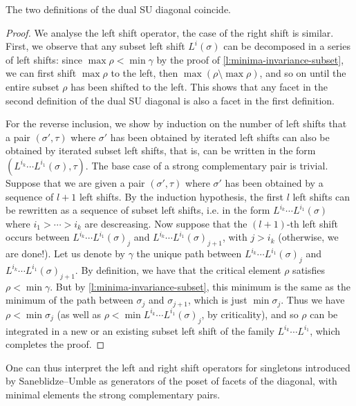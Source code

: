 \begin{proposition}
    The two definitions of the dual SU diagonal coincide. 
\end{proposition}

\begin{proof}
    We analyse the left shift operator, the case of the right shift is similar. 
    First, we observe that any subset left shift $L^{i}(\sigma)$ can be decomposed in a series of left shifts: since $\max \rho < \min \gamma$ by the proof of \cref{l:minima-invariance-subset}, we can first shift $\max \rho$ to the left, then $\max (\rho \setminus \max \rho)$, and so on until the entire subset $\rho$ has been shifted to the left. 
    This shows that any facet in the second definition of the dual SU diagonal is also a facet in the first definition. 

    For the reverse inclusion, we show by induction on the number of left shifts that a pair $(\sigma',\tau)$ where $\sigma'$ has been obtained by iterated left shifts can also be obtained by iterated subset left shifts, that is, can be written in the form $(L^{i_k}\cdots L^{i_1}(\sigma), \tau)$.
    The base case of a strong complementary pair is trivial. 
    Suppose that we are given a pair $(\sigma',\tau)$ where $\sigma'$ has been obtained by a sequence of $l+1$ left shifts. 
    By the induction hypothesis, the first $l$ left shifts can be rewritten as a sequence of subset left shifts, i.e. in the form $L^{i_k}\cdots L^{i_1}(\sigma)$ where $i_1 > \cdots > i_k$ are descreasing.
    Now suppose that the $(l+1)$-th left shift occurs between $L^{i_k}\cdots L^{i_1}(\sigma)_j$ and $L^{i_k}\cdots L^{i_1}(\sigma)_{j+1}$, with $j> i_k$ (otherwise, we are done!). 
    Let us denote by $\gamma$ the unique path between $L^{i_k}\cdots L^{i_1}(\sigma)_j$ and $L^{i_k}\cdots L^{i_1}(\sigma)_{j+1}$.
    By definition, we have that the critical element $\rho$ satisfies $\rho < \min \gamma$.  
    But by \cref{l:minima-invariance-subset}, this minimum is the same as the minimum of the path between $\sigma_j$ and $\sigma_{j+1}$, which is just $\min \sigma_j$. 
    Thus we have $\rho < \min \sigma_j$ (as well as $\rho < \min L^{i_k}\cdots L^{i_1}(\sigma)_j$, by criticality), and so $\rho$ can be integrated in a new or an existing subset left shift of the family $L^{i_k}\cdots L^{i_1}$, which completes the proof. 
\end{proof}

One can thus interpret the left and right shift operators for singletons introduced by Saneblidze--Umble as generators of the poset of facets of the diagonal, with minimal elements the strong complementary pairs.

